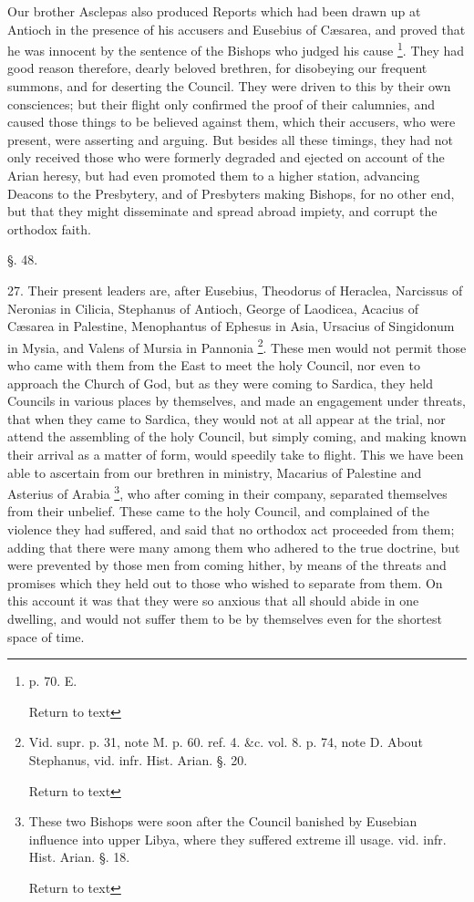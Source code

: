 Our brother Asclepas also produced Reports which
had been drawn up at Antioch in the presence of his accusers and
Eusebius of Cæsarea, and proved that he was innocent by the sentence
of the Bishops who judged his cause \footnote{p. 70. E.

Return to text}. They had good reason
therefore, dearly beloved brethren, for disobeying our frequent
summons, and for deserting the Council. They were driven to this by
their own consciences; but their flight only confirmed the proof of
their calumnies, and caused those things to be believed against them,
which their accusers, who were present, were asserting and arguing.
But besides all these timings, they had not only received those who
were formerly degraded and ejected on account of the Arian heresy, but
had even promoted them to a higher station, advancing Deacons to the
Presbytery, and of Presbyters making Bishops, for no other end, but
that they might disseminate and spread abroad impiety, and corrupt the
orthodox faith.

§. 48.

27. Their present leaders are, after Eusebius,
Theodorus of Heraclea, Narcissus of Neronias in Cilicia, Stephanus of
Antioch, George of Laodicea, Acacius of Cæsarea in Palestine,
Menophantus of Ephesus in Asia, Ursacius of Singidonum in Mysia, and
Valens of Mursia in Pannonia \footnote{Vid. supr. p. 31, note M. p. 60. ref. 4.
\&c. vol. 8. p. 74, note D. About Stephanus, vid. infr. Hist.
Arian. §. 20.

Return to text}. These men would not permit
those who came with them from the East to meet the holy Council, nor
even to approach the Church of God, but as they were coming to Sardica,
they held Councils in various places by themselves, and made an
engagement under threats, that when they came to Sardica, they would
not at all appear at the trial, nor attend the assembling of the holy
Council, but simply coming, and making known their arrival as a matter
of form, would speedily take to flight. This we have been able to
ascertain from our brethren in ministry, Macarius of Palestine and
Asterius of Arabia \footnote{These two Bishops were soon after the Council
banished by Eusebian influence into upper Libya, where they suffered
extreme ill usage. vid. infr. Hist. Arian. §. 18.

Return to text}, who after coming in their company,
separated themselves from their unbelief. These came to the holy
Council, and complained of the violence they had suffered, and said
that no orthodox act proceeded from them; adding that there were many
among them who adhered to the true doctrine, but were prevented
by those men from coming hither, by means of the threats and promises
which they held out to those who wished to separate from them. On this
account it was that they were so anxious that all should abide in one
dwelling, and would not suffer them to be by themselves even for the
shortest space of time.

